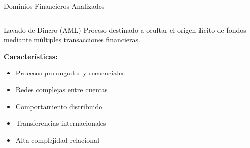\documentclass[aspectratio=169, 8pt]{beamer}
\begin{document}
\begin{frame}{Dominios Financieros Analizados}
\begin{columns}
\begin{block}{Lavado de Dinero (AML)}
Proceso destinado a ocultar el origen
ilícito de fondos mediante múltiples
transacciones financieras.

\vspace{0.2cm}
\textbf{Características:}
\begin{itemize}
    \item Procesos prolongados y secuenciales
    \item Redes complejas entre cuentas
    \item Comportamiento distribuido
    \item Transferencias internacionales
    \item Alta complejidad relacional
\end{itemize}
\end{block}

\end{columns}
\end{frame}
\end{document}
